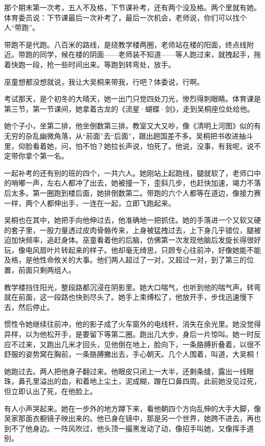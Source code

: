 \documentclass[lang=cn,newtx,12pt,scheme=chinese]{elegantbook}
\begin{document}
那个期末第一次考，五人不及格，下节课补考，还有两个没及格。两个里就有她。体育委员说：下节课最后一次补考了，最后一次机会，老师说，你们可以找个人“带跑”。

带跑不是代跑。八百米的路线，是绕教学楼两圈，老师站在楼的阳面，终点线附近。带跑的同学，候在楼的阴面——老师装不知道——等人跑过来，就拽起手，拖着快跑一段，抢一些时间出来。等跑到转弯处，放手。

巫童想都没想就说，我让大吴桐来带我，行吧？体委说，行啊。

考试那天，是个初冬的大晴天，她一出门只觉四处刀光，惨烈得刺眼睛。体育课是第三节，第一节课间，她拿着古龙的《流星·蝴蝶·剑》，走到吴桐座位处给他。

她个子小，坐第二排，他坐倒数第三排。教室又大又吵，像《清明上河图》似的有无穷的杂乱幽微角落，从“前面”去“后面”，跟出趟国差不多。吴桐把书收进抽斗里，仰脸看着她，问，怕不怕？她拉长声说，怕死了。他说，没事，有我呢，说不定带你拿个第一名。

一起补考的还有别的班的四个，一共六人。她刚站上起跑线，腿就软了，老师口中的哨嘟一声，左右人都冲了出去，她被撞一下，歪斜几步，也赶快加速，竭力不落后太多。第一圈跑到楼后面，她排倒数第二。带跑的六个人都等在道边，像接力赛一样，两个人都伸出手，一连在一起，立即飞跑起来。

吴桐也在其中，她把手向他伸过去，他准确地一把抓住。她的手落进一个又软又硬的套子里，一股力量透过皮肉骨骼传来，上身被猛拽过去，上下身几乎错位，腿被迫加快频率，追赶身体。巫童看着他的后脑，仿佛第一次发现他脑后发旋长得很好玩，像电风扇叶片转起来的样子。他却毫无绮思，只顾专心往前冲，好像她能不能及格，是他性命攸关的大事。他们两人超过了一对，又超过一对，到了第三的位置，前面只剩两组人。

教学楼挡住阳光，整段路都沉浸在阴影里。她大口喘气，也听到他的喘气声。转弯就在前面，这一段路也快到尽头了。她手上束缚松了，他放开手，步伐迅速慢下去，然后停止。

惯性令她继续往前冲，他的影子成了火车窗外的电线杆，消失在余光里。她没觉得异样，以为他松开手，是要留下等第二圈。跑出几大步，身后一片惊叫。她一时反应不过来，又跑出几米才回头，见他倒在地上，脸向下，一条胳膊折叠着，以很不舒服的姿势窝在胸前，一条胳膊撇出去，手心朝天。几个人围着，叫道，大吴桐！

她跑过去。两人把他身子翻过来。他眼皮只闭上一大半，还剩条缝，露出一线眼珠，鼻孔里溢出的血，和着地上尘土，泥成糊，蹭在口鼻四周。此前她没见过死，但立即认出了死，在他脸上。

有人小声哭起来。她在一步外的地方蹲下来，看他朝四个方向乱伸的大手大脚，像吴家那面衣橱镜子映出来的。他已身在镜中，那是另一个世界，她跨不进去，再也到不了他身边。一阵风吹过，他头顶一撮黑发动了动，像招手叫她，又像挥手道别。
\end{document}
